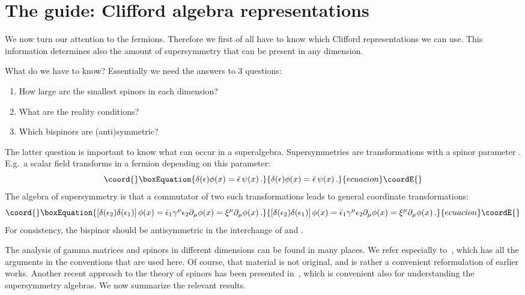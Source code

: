 \documentclass[a4paper,11pt,twoside]{article}
\providecommand{\bitem}[1]{\vspace{-2mm} %
\begin{#1} \setlength{\itemsep}{-5pt} } %
\providecommand{\eitem}[1]{\end{#1}\vspace{-2mm}} %
\begin{document}
\section{The guide: Clifford algebra representations} \label{ss:Clifford}
We now turn our attention to the fermions. Therefore we first of all have
to know which Clifford representations we can use. This information
determines also the amount of supersymmetry that can be present in any
dimension.

What do we have to know? Essentially we need the answers to 3 questions:
 \bitem{enumerate}
  \item How large are the smallest spinors in each dimension?
  \item What are the reality conditions?
  \item Which bispinors are (anti)symmetric?
 \eitem{enumerate}
The latter question is important to know what can occur in a
superalgebra. Supersymmetries are transformations with a spinor parameter
\myHighlight{$\epsilon $}\coordHE{}. E.g.\ a scalar field \coordHE{} transforms in a fermion
\coordHE{} depending on this parameter:
\begin{equation}\coord{}\boxEquation{
  \delta (\epsilon )\phi(x) =\bar \epsilon\, \psi (x)\,.
 \label{susyscalar}
}{
  \delta (\epsilon )\phi(x) =\bar \epsilon\, \psi (x)\,.
 }{ecuacion}\coordE{}\end{equation}
The algebra of supersymmetry is that a commutator of two such
transformations leads to general coordinate transformations:
\begin{equation}\coord{}\boxEquation{
  \left[\delta (\epsilon _2)\delta (\epsilon _1)\right] \phi (x)=\bar \epsilon _1\gamma ^\mu
\epsilon _2\partial _\mu \phi(x)= \xi ^\mu\partial _\mu \phi(x)\,.
 \label{susyalgscalar}
}{
  \left[\delta (\epsilon _2)\delta (\epsilon _1)\right] \phi (x)=\bar \epsilon _1\gamma ^\mu
\epsilon _2\partial _\mu \phi(x)= \xi ^\mu\partial _\mu \phi(x)\,.
 }{ecuacion}\coordE{}\end{equation}
For consistency, the bispinor \coordHE{} should be antisymmetric in the interchange of \coordHE{}
and \coordHE{}.

The analysis of gamma matrices and spinors in different dimensions can be
found in many places. We refer especially
to~\cite[section~3]{VanProeyen:1999ni}, which has all the arguments in
the conventions that are used here. Of course, that material is not
original, and is rather a convenient reformulation of earlier works.
Another recent approach to the theory of spinors has been presented
in~\cite{D'Auria:2000ec}, which is convenient also for understanding the
supersymmetry algebras. We now summarize the relevant results.
\end{document}
